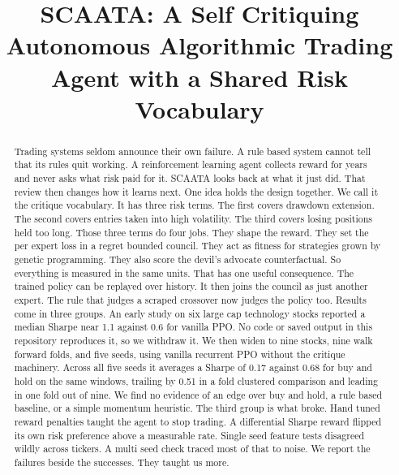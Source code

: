 \documentclass[conference]{IEEEtran}
\begin{document}
\title{SCAATA: A Self Critiquing Autonomous Algorithmic Trading Agent with a Shared Risk Vocabulary}

\author{
\and
{}
}

\maketitle

\begin{abstract}
Trading systems seldom announce their own failure. A rule based system cannot tell that its rules quit working. A reinforcement learning agent collects reward for years and never asks what risk paid for it. SCAATA looks back at what it just did. That review then changes how it learns next. One idea holds the design together. We call it the critique vocabulary. It has three risk terms. The first covers drawdown extension. The second covers entries taken into high volatility. The third covers losing positions held too long. Those three terms do four jobs. They shape the reward. They set the per expert loss in a regret bounded council. They act as fitness for strategies grown by genetic programming. They also score the devil's advocate counterfactual. So everything is measured in the same units. That has one useful consequence. The trained policy can be replayed over history. It then joins the council as just another expert. The rule that judges a scraped crossover now judges the policy too. Results come in three groups. An early study on six large cap technology stocks reported a median Sharpe near 1.1 against 0.6 for vanilla PPO. No code or saved output in this repository reproduces it, so we withdraw it. We then widen to nine stocks, nine walk forward folds, and five seeds, using vanilla recurrent PPO without the critique machinery. Across all five seeds it averages a Sharpe of 0.17 against 0.68 for buy and hold on the same windows, trailing by 0.51 in a fold clustered comparison and leading in one fold out of nine. We find no evidence of an edge over buy and hold, a rule based baseline, or a simple momentum heuristic. The third group is what broke. Hand tuned reward penalties taught the agent to stop trading. A differential Sharpe reward flipped its own risk preference above a measurable rate. Single seed feature tests disagreed wildly across tickers. A multi seed check traced most of that to noise. We report the failures beside the successes. They taught us more.
\end{abstract}
\end{document}
